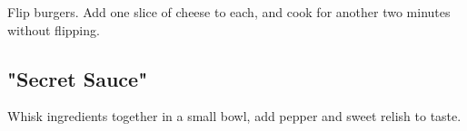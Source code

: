 \begin{recipe}
Flip burgers. Add one slice of cheese to each, and cook for another two minutes without flipping.


\subsection{"Secret Sauce"}



Whisk ingredients together in a small bowl, add pepper and sweet relish to taste.

\end{recipe}
